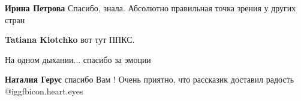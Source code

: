 \begin{itemize}
\begin{itemize}
\textbf{Ирина Петрова} Спасибо, знала. Абсолютно правильная точка зрения у других стран

\textbf{Tatiana Klotchko} вот тут ППКС.
\end{itemize} %

На одном дыхании... спасибо за эмоции

\begin{itemize} %
\textbf{Наталия Герус} спасибо Вам ! Очень приятно, что рассказик доставил радость @igg{fbicon.heart.eyes} 
\end{itemize} %

\end{itemize} %
